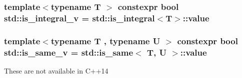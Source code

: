 \subsubsection[{\texorpdfstring{is\+\_\+integral\+\_\+v}{is_integral_v}}]{\setlength{\rightskip}{0pt plus 5cm}template$<$typename T $>$ constexpr bool std\+::is\+\_\+integral\+\_\+v = {\bf std\+::is\+\_\+integral}$<$T$>$\+::value}\hypertarget{namespacestd_a824c5eb1a7e8aafa382dc9af3329a9e8}{}\label{namespacestd_a824c5eb1a7e8aafa382dc9af3329a9e8}
\subsubsection[{\texorpdfstring{is\+\_\+same\+\_\+v}{is_same_v}}]{\setlength{\rightskip}{0pt plus 5cm}template$<$typename T , typename U $>$ constexpr bool std\+::is\+\_\+same\+\_\+v = {\bf std\+::is\+\_\+same}$<$ T, U $>$\+::value}\hypertarget{namespacestd_a50247bc7f9f04615f77ddc81056bb0af}{}\label{namespacestd_a50247bc7f9f04615f77ddc81056bb0af}
These are not available in C++14 
